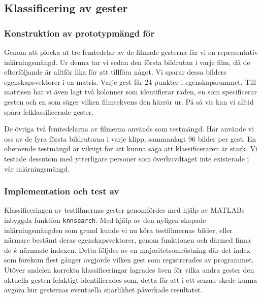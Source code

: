 \documentclass[../rapport_MVEX01-11-05]{subfiles}
\begin{document}
\subsection{Klassificering av gester} 
\subsubsection{Konstruktion av prototypmängd för \knn}
Genom att plocka ut tre femtedelar av de filmade gesterna får vi en
representativ inlärningsmängd. Ur denna tar vi sedan den första bildrutan i
varje film, då de efterföljande är alltför lika för att tillföra något. Vi
sparar dessa bilders egenskapsvektorer i en matris. Varje gest får 24 punkter i
egenskapsrummet. Till matrisen har vi även lagt två kolonner som identifierar
raden, en som specificerar gesten och en som säger vilken filmsekvens den härrör
ur. På så vis kan vi alltid spåra felklassificerade gester.

De övriga två femtedelarna av filmerna används som testmängd. Här använde vi oss
av de fyra första bildrutorna i varje klipp, sammanlagt 96 bilder per gest.
En oberoende testmängd är viktigt för att kunna säga att klassificeraren är
stark. Vi testade dessutom med ytterligare personer som överhuvdtaget inte
existerade i vår inlärningsmängd.

\subsubsection{Implementation och test av \knn}
Klassificeringen av testfilmernas gester genomfördes med hjälp av MATLABs
inbyggda funktion \texttt{knnsearch}. Med hjälp av den nyligen skapade
inlärningsmängden som grund kunde vi nu köra testfilmernas bilder,
eller närmare bestämt deras egenskapsvektorer, genom funktionen och därmed finna de $k$ närmaste indexen.
Detta följdes av en majoritetsomröstning där det index som förekom flest gånger
avgjorde vilken gest som registrerades av programmet. Utöver andelen korrekta
klassificeringar lagrades även för vilka andra gester den aktuella gesten
felaktigt identifierades som, detta för att i ett senare skede kunna avgöra hur
gesternas eventuella snarlikhet påverkade resultatet.
\end{document}
